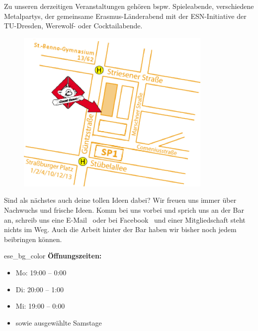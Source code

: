 Zu unseren derzeitigen Veranstaltungen gehören bspw. Spieleabende, verschiedene Metalpartys, der gemeinsame Erasmus-Länderabend mit der ESN-Initiative der TU-Dresden, Werewolf- oder Cocktailabende.

\begin{figure}%
  \includegraphics[width=\linewidth]{img/cd-anfahrt}
  \vspace{-1cm}
\end{figure}

Sind als nächstes auch deine tollen Ideen dabei?
Wir freuen uns immer über Nachwuchs und frische Ideen.
Komm bei uns vorbei und sprich uns an der Bar an, schreib uns eine E-Mail~ oder bei Facebook~ und einer Mitgliedschaft steht nichts im Weg.
Auch die Arbeit hinter der Bar haben wir bisher noch jedem beibringen können.

\begin{awesomeblock}{2pt}{\faCalendar*[regular]}{ese_bg_color}
    \textbf{Öffnungszeiten:}
    \begin{itemize}[noitemsep]
        \item Mo: 19:00 – 0:00
        \item Di: 20:00 – 1:00
        \item Mi: 19:00 – 0:00
        \item sowie ausgewählte Samstage
        \vspace*{-\baselineskip}
    \end{itemize}
\end{awesomeblock}
